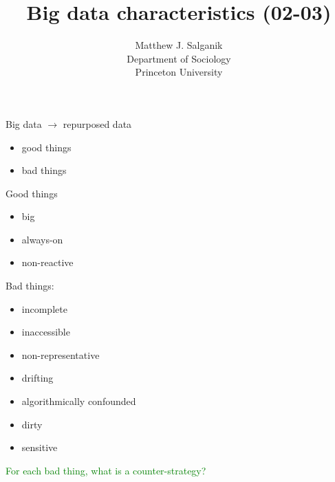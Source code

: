 \documentclass[aspectratio=169]{beamer}
\title[]{Big data characteristics (02-03)}
\author[]{Matthew J. Salganik\\Department of Sociology\\Princeton University}
\date[]{Soc 596: Computational Social Science
\vfill
\begin{flushright}
\vspace{0.6in}
\texttt{[image: figures/cc.png]}
\end{flushright}
}
\def\vf{\vfill}
\begin{document}
\frame{\titlepage}
\begin{frame}

Big data $\rightarrow$ repurposed data
\begin{itemize}
\item good things
\item bad things
\end{itemize}

\end{frame}
\begin{frame}

Good things
\begin{itemize}
\item big 
\pause
\item always-on
\pause
\item non-reactive 
\end{itemize}

\end{frame}
\begin{frame}

Bad things:
\begin{itemize}
\item incomplete
\pause
\item inaccessible
\pause
\item non-representative
\pause
\item drifting
\pause
\item algorithmically confounded
\pause
\item dirty
\pause
\item sensitive 
\end{itemize}
\vf
\pause
\textcolor{green}{For each bad thing, what is a counter-strategy?}

\end{frame}
\end{document}
